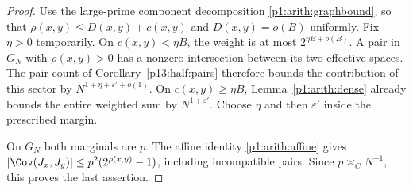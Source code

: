 \begin{proof}
Use the large-prime component decomposition
\eqref{p1:arith:graphbound}, so that
$\rho(x,y)\leq D(x,y)+c(x,y)$ and $D(x,y)=o(B)$ uniformly.
Fix $\eta>0$ temporarily.  On $c(x,y)<\eta B$, the weight is
at most $2^{\eta B+o(B)}$.  A pair in $G_N$ with $\rho(x,y)>0$
has a nonzero intersection between its two effective spaces.  The pair
count of Corollary~\ref{p13:half:pairs} therefore bounds the contribution
of this sector by $N^{1+\eta+\varepsilon'+o(1)}$.
On $c(x,y)\geq\eta B$, Lemma~\ref{p1:arith:dense} already bounds the
entire weighted sum by $N^{1+\varepsilon'}$.  Choose $\eta$ and then
$\varepsilon'$ inside the prescribed margin.

On $G_N$ both marginals are $p$.  The affine identity
\eqref{p1:arith:affine} gives
$|\Cov(J_x,J_y)|\leq p^2(2^{\rho(x,y)}-1)$, including incompatible
pairs.  Since $p\asymp_C N^{-1}$, this proves the last assertion.
\end{proof}

